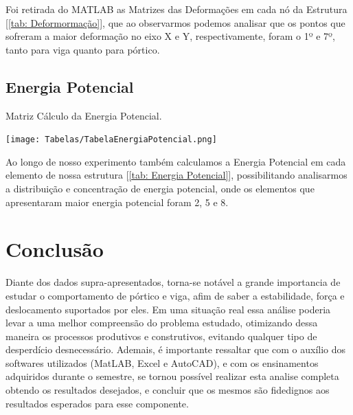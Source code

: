 \documentclass[deposito, acronym, symbols]{fei}
\begin{document}
Foi retirada do MATLAB as Matrizes das Deformações em cada nó da Estrutura [\ref{tab: Deformormação}], que ao observarmos podemos analisar que os pontos que sofreram a maior deformação no eixo X e Y, respectivamente, foram o 1º e 7º, tanto para viga quanto para pórtico. 

\section{Energia Potencial}

\begin{table}[!htb]
 \centering
    \caption{Matriz Cálculo da Energia Potencial.}
    \texttt{[image: Tabelas/TabelaEnergiaPotencial.png]}
    \label{tab: Energia Potencial}
 \end{table}

Ao longo de nosso experimento também calculamos a Energia Potencial em cada elemento de nossa estrutura [\ref{tab: Energia Potencial}], possibilitando analisarmos a distribuição e concentração de energia potencial, onde os elementos que apresentaram maior energia potencial foram 2, 5 e 8.
 
\chapter{Conclusão}

Diante dos dados supra-apresentados, torna-se notável a grande importancia de estudar o comportamento de pórtico e viga, afim de saber a estabilidade, força e deslocamento suportados por eles. Em uma situação real essa análise poderia levar a uma melhor compreensão do problema estudado, otimizando dessa maneira os processos produtivos e construtivos, evitando qualquer tipo de desperdício desnecessário. Ademais, é importante ressaltar que com o auxílio dos softwares utilizados (MatLAB, Excel e AutoCAD), e com os ensinamentos adquiridos durante o semestre, se tornou possível realizar esta analise completa obtendo os resultados desejados, e concluir que os mesmos são fidedignos aos resultados esperados para esse componente. 

\printbibliography[type=online]
\nocite{*}
\end{document}
